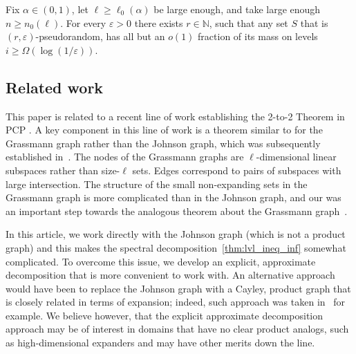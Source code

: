 \documentclass{toc}
\newcommand\eps{\varepsilon}
\renewcommand\geq{\geqslant}
\begin{document}
\begin{theorem}[Informal]\label{thm:lvl_ineq_inf}
  Fix $\alpha\in (0,1)$, let $\ell\geq\ell_0(\alpha)$ be large enough, and take large enough $n\geq n_0(\ell)$.
  For every $\eps>0$ there exists $r\in\mathbb{N}$, such that any set $S$ that is $(r,\eps)$-pseudorandom,
  has all but %
an $o(1)$ fraction  %
of its mass on levels $i\geq \Omega(\log(1/\eps))$.
\end{theorem}

%
%
\subsection{Related work}
This paper is related to a recent line of work establishing the 2-to-2 Theorem
in PCP \cite{KMS,DKKMS,DKKMSgras,KMS2}. A key component in this line of work is
a theorem similar to  for the Grassmann graph rather than
the Johnson graph, which was subsequently established in~\cite{KMS2}. The nodes of
the Grassmann graphs are $\ell$-dimensional linear subspaces rather than size-$\ell$
sets. Edges correspond to %
%
pairs of subspaces with large intersection.  %
The structure of
the small non-expanding sets in the Grassmann graph is more complicated than
%
in   %
the Johnson graph, and our  was an important step
towards the analogous theorem about the Grassmann graph~\cite{KMS2}.

In this %
article,   %
we work directly with the Johnson graph (which is not a product graph) and this makes the spectral decomposition~\eqref{thm:lvl_ineq_inf} somewhat complicated. To
overcome this issue, we develop an explicit, approximate decomposition that is more convenient to work with. An alternative approach would have been to replace the Johnson graph
with a Cayley, product graph that is closely related in terms of expansion; indeed, such approach was taken in~\cite{KMS2} for example. We believe however, that the explicit
approximate decomposition approach may be of interest in domains that have no clear product analogs,
such as high-dimensional expanders \cite{bafna2021hypercontractivity,gur2021hypercontractivity} and may have other merits down the line.
\end{document}
